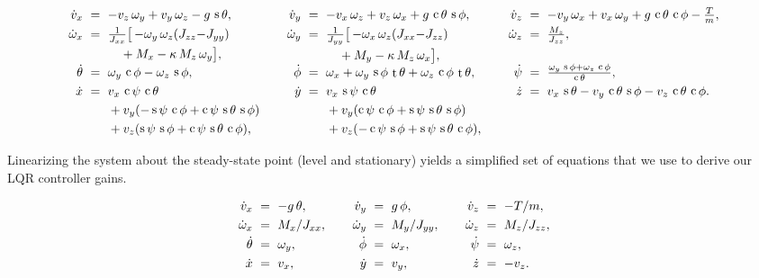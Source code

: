 \documentclass[conf]{new-aiaa}
\DeclareMathOperator{\s}{s}
\DeclareMathOperator{\cs}{c}
\DeclareMathOperator{\tn}{t}
\begin{document}
\small
\begin{equation}
\label{eq:nonlinear-eom}
\setlength{\arraycolsep}{3pt}
\begin{array}{rclcrclcrcl}
\dot v_x &=& -v_z\,\omega_y + v_y\,\omega_z - g\,\s\theta, &\quad&
\dot v_y &=& -v_x\,\omega_z + v_z\,\omega_x + g\,\cs\theta\,\s\phi, &\quad&
\dot v_z &=& -v_y\,\omega_x + v_x\,\omega_y + g\,\cs\theta\,\cs\phi - \tfrac{T}{m}, \\[3pt]
\dot\omega_x &=& \begin{aligned}[t]
&\tfrac{1}{J_{xx}}\bigl[\,{-}\omega_y\,\omega_z(J_{zz}{-}J_{yy}) \\
&\quad + M_x - \kappa\,M_z\,\omega_y\bigr],
\end{aligned} &&
\dot\omega_y &=& \begin{aligned}[t]
&\tfrac{1}{J_{yy}}\bigl[\,{-}\omega_x\,\omega_z(J_{xx}{-}J_{zz}) \\
&\quad + M_y - \kappa\,M_z\,\omega_x\bigr],
\end{aligned} &&
\dot\omega_z &=& \tfrac{M_z}{J_{zz}}, \\[3pt]
\dot\theta &=& \omega_y\,\cs\phi - \omega_z\,\s\phi, &&
\dot\phi &=& \omega_x + \omega_y\,\s\phi\,\tn\theta + \omega_z\,\cs\phi\,\tn\theta, &&
\dot\psi &=& \tfrac{\omega_y\,\s\phi + \omega_z\,\cs\phi}{\cs\theta}, \\[3pt]
\dot x &=& \begin{aligned}[t]
&v_x\,\cs\psi\,\cs\theta \\
&+ v_y(-\s\psi\,\cs\phi + \cs\psi\,\s\theta\,\s\phi) \\
&+ v_z(\s\psi\,\s\phi + \cs\psi\,\s\theta\,\cs\phi),
\end{aligned} &&
\dot y &=& \begin{aligned}[t]
&v_x\,\s\psi\,\cs\theta \\
&+ v_y(\cs\psi\,\cs\phi + \s\psi\,\s\theta\,\s\phi) \\
&+ v_z(-\cs\psi\,\s\phi + \s\psi\,\s\theta\,\cs\phi),
\end{aligned} &&
\dot z &=& v_x\,\s\theta - v_y\,\cs\theta\,\s\phi - v_z\,\cs\theta\,\cs\phi.
\end{array}
\end{equation}
\normalsize

Linearizing the system about the steady-state point (level and stationary) yields a simplified set of equations that we use to derive our LQR controller gains.

\small
\begin{equation}
\label{eq:linear-eom}
\setlength{\arraycolsep}{3pt}
\begin{array}{rclcrclcrcl}
\dot v_x &=& -g\,\theta, &\quad& \dot v_y &=& g\,\phi, &\quad& \dot v_z &=& -T/m, \\[3pt]
\dot\omega_x &=& M_x/J_{xx}, && \dot\omega_y &=& M_y/J_{yy}, && \dot\omega_z &=& M_z/J_{zz}, \\[3pt]
\dot\theta &=& \omega_y, && \dot\phi &=& \omega_x, && \dot\psi &=& \omega_z, \\[3pt]
\dot x &=& v_x, && \dot y &=& v_y, && \dot z &=& -v_z.
\end{array}
\end{equation}
\normalsize
\end{document}
